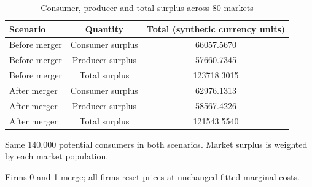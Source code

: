 \begingroup
\begin{table}[htbp]
\centering
\caption{Consumer, producer and total surplus across 80 markets}
\label{tab:specialist-blp-random-r01-displays-welfare_totals-main}
\begin{tabular}{lcc}
\toprule
Scenario & Quantity & Total (synthetic currency units) \\
\midrule
Before merger & Consumer surplus & 66057.5670 \\
Before merger & Producer surplus & 57660.7345 \\
Before merger & Total surplus & 123718.3015 \\
After merger & Consumer surplus & 62976.1313 \\
After merger & Producer surplus & 58567.4226 \\
After merger & Total surplus & 121543.5540 \\
\bottomrule
\end{tabular}
\par\medskip\begin{minipage}{\linewidth}\footnotesize
Same 140,000 potential consumers in both scenarios. Market surplus is weighted by each market population.\par Firms 0 and 1 merge; all firms reset prices at unchanged fitted marginal costs.
\end{minipage}
\end{table}
\endgroup

